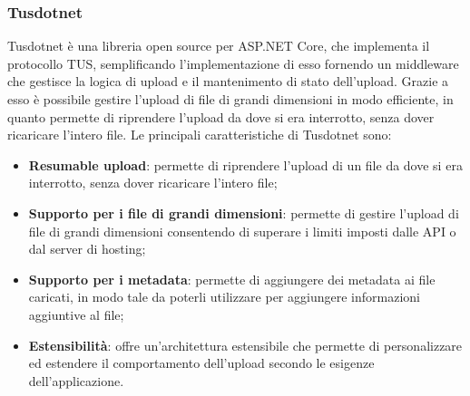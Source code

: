 \subsubsection{Tusdotnet}
Tusdotnet è una libreria open source per ASP.NET Core, che implementa il protocollo TUS, semplificando l'implementazione di esso fornendo un middleware che gestisce la logica di upload e il mantenimento di stato dell'upload. Grazie a esso è possibile gestire l'upload di file di grandi dimensioni in modo efficiente, in quanto permette di riprendere l'upload da dove si era interrotto, senza dover ricaricare l'intero file. Le principali caratteristiche di Tusdotnet sono:
\begin{itemize}
    \item \textbf{Resumable upload}: permette di riprendere l'upload di un file da dove si era interrotto, senza dover ricaricare l'intero file;
    \item \textbf{Supporto per i file di grandi dimensioni}: permette di gestire l'upload di file di grandi dimensioni consentendo di superare i limiti imposti dalle API o dal server di hosting;
    \item \textbf{Supporto per i metadata}: permette di aggiungere dei metadata ai file caricati, in modo tale da poterli utilizzare per aggiungere informazioni aggiuntive al file;
    \item \textbf{Estensibilità}: offre un'architettura estensibile che permette di personalizzare ed estendere il comportamento dell'upload secondo le esigenze dell'applicazione. 
\end{itemize}
